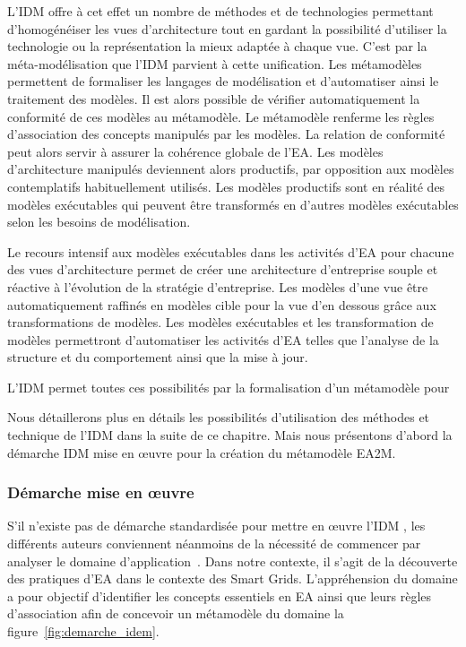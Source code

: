    L'IDM offre à cet effet un nombre de méthodes et de technologies permettant d’homogénéiser
    les vues d'architecture tout en gardant la possibilité d'utiliser la technologie ou la représentation
    la mieux adaptée à chaque vue.
    C'est par la méta-modélisation que l'IDM parvient à cette unification. Les métamodèles
    permettent de formaliser les langages de modélisation  et d'automatiser ainsi
    le traitement des modèles.
    Il est alors possible de vérifier automatiquement la conformité de ces modèles au métamodèle.
    Le métamodèle renferme les règles d'association des concepts manipulés par les modèles.
    La relation de conformité peut alors servir à assurer la cohérence globale de l'EA.
    Les modèles d'architecture manipulés deviennent alors productifs,
    par opposition aux modèles contemplatifs habituellement utilisés. Les modèles productifs sont
    en réalité des modèles exécutables qui peuvent être transformés en d'autres modèles exécutables
    selon les besoins de modélisation.

    Le recours intensif aux modèles exécutables dans les activités d'EA
    pour chacune des vues d'architecture permet de créer une architecture d'entreprise
    souple et réactive à l'évolution de la stratégie d'entreprise. Les modèles d'une vue être automatiquement
    raffinés en modèles cible pour la vue d'en dessous grâce aux transformations de modèles. Les modèles
    exécutables et les transformation de modèles permettront d'automatiser
    les activités d'EA telles que l'analyse de la structure et du comportement
    ainsi que la mise à jour.

    L'IDM permet toutes ces possibilités par la formalisation d'un métamodèle pour

    Nous détaillerons plus en détails les possibilités d'utilisation des méthodes et technique de l'IDM
    dans la suite de ce chapitre. Mais nous présentons d'abord la démarche IDM mise en
    œuvre pour la création du métamodèle EA2M.

            \subsubsection{Démarche mise en œuvre}

    S'il n'existe pas de démarche standardisée pour mettre en œuvre
    l'IDM \cite{barbier13phd}, les différents auteurs conviennent néanmoins de la
    nécessité  de commencer par analyser le domaine d'application~\cite{jezequel2012ingenierie}.
    Dans notre contexte, il s'agit de la découverte des pratiques
    d'EA dans le contexte des Smart Grids. L’appréhension du domaine a
    pour objectif d'identifier les concepts essentiels en EA ainsi que leurs
    règles d'association afin de concevoir un métamodèle du domaine la
    figure~\ref{fig:demarche_idem}.

